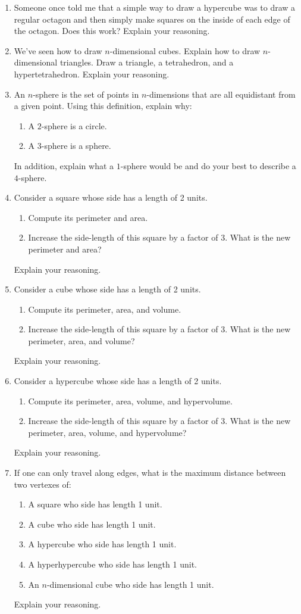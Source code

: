 \begin{enumerate}
\begin{center}
\begin{tabular}{|c || c| c| c|c|}
\end{tabular}
\end{center}
\item Someone once told me that a simple way to draw a hypercube was
  to draw a regular octagon and then simply make squares on the inside
  of each edge of the octagon. Does this work?  Explain your
  reasoning.
\item We've seen how to draw $n$-dimensional cubes. Explain how to
  draw $n$-dimensional triangles. Draw a triangle, a tetrahedron, and
  a hypertetrahedron. Explain your reasoning.
\item An $n$-sphere is the set of points in $n$-dimensions that are
  all equidistant from a given point. Using this definition, explain
  why:
\begin{enumerate}
\item A $2$-sphere is a circle.
\item A $3$-sphere is a sphere.
\end{enumerate}
In addition, explain what a $1$-sphere would be and do your best to
describe a $4$-sphere.
\item Consider a square whose side has a length of 2 units.
\begin{enumerate}
\item Compute its perimeter and area.
\item Increase the side-length of this square by a factor of 3. What
  is the new perimeter and area?
\end{enumerate}
Explain your reasoning. 
\item Consider a cube whose side has a length of 2 units.
\begin{enumerate}
\item Compute its perimeter, area, and volume.
\item Increase the side-length of this square by a factor of 3. What
  is the new perimeter, area, and volume?
\end{enumerate}
Explain your reasoning. 
\item Consider a hypercube whose side has a length of 2 units.
\begin{enumerate}
\item Compute its perimeter, area, volume, and hypervolume.
\item Increase the side-length of this square by a factor of 3. What
  is the new perimeter, area, volume, and hypervolume?
\end{enumerate}
Explain your reasoning. 
\item If one can only travel along edges, what is the maximum distance
  between two vertexes of:
\begin{enumerate}
\item A square who side has length 1 unit.
\item A cube who side has length 1 unit.
\item A hypercube who side has length 1 unit.
\item A hyperhypercube who side has length 1 unit.
\item An $n$-dimensional cube who side has length 1 unit.
\end{enumerate}
Explain your reasoning.
\end{enumerate}

